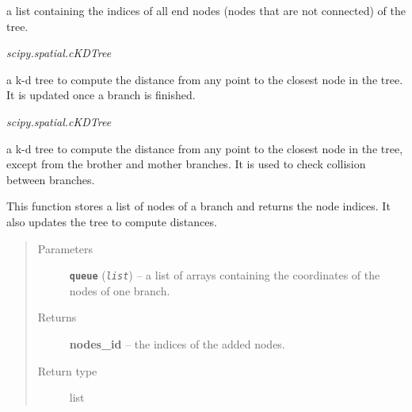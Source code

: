 \documentclass[letterpaper,10pt,english]{sphinxmanual}
\begin{document}
\begin{fulllineitems}
\begin{fulllineitems}
a list containing the indices of all end nodes (nodes that are not connected) of the tree.

\end{fulllineitems}


\begin{fulllineitems}
\label{Branch3D:Branch3D.Nodes.tree}
\emph{scipy.spatial.cKDTree}

a k-d tree to compute the distance from any point to the closest node in the tree. It is updated once a branch is finished.

\end{fulllineitems}


\begin{fulllineitems}
\label{Branch3D:Branch3D.Nodes.collision_tree}
\emph{scipy.spatial.cKDTree}

a k-d tree to compute the distance from any point to the closest node in the tree, except from the brother and mother branches. It is used to check collision between branches.

\end{fulllineitems}


\begin{fulllineitems}
\label{Branch3D:Branch3D.Nodes.add_nodes}
This function stores a list of nodes of a branch and returns the node indices. It also updates the tree to compute distances.
\begin{quote}\begin{description}
\item[{Parameters}] \leavevmode
\textbf{\texttt{queue}} (\emph{\texttt{list}}) -- a list of arrays containing the coordinates of the nodes of one branch.

\item[{Returns}] \leavevmode
\textbf{nodes\_id} --
the indices of the added nodes.

\item[{Return type}] \leavevmode
list

\end{description}\end{quote}

\end{fulllineitems}


\end{fulllineitems}
\end{document}
